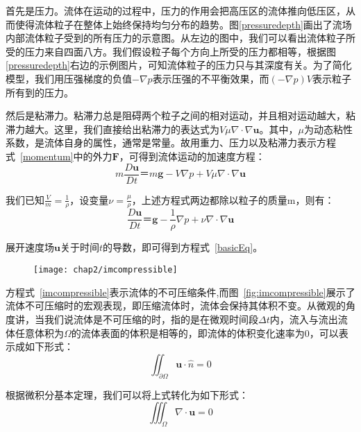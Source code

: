 首先是压力。流体在运动的过程中，压力的作用会把高压区的流体推向低压区，从而使得流体粒子在整体上始终保持均匀分布的趋势。图\ref{pressuredepth}画出了流场内部流体粒子受到的所有压力的示意图。从左边的图中，我们可以看出流体粒子所受的压力来自四面八方。我们假设粒子每个方向上所受的压力都相等，根据图\ref{pressuredepth}右边的示例图片，可知流体粒子的压力只与其深度有关。为了简化模型，我们用压强梯度的负值\(-\nabla p\)表示压强的不平衡效果，而\(({-\nabla p})V\)表示粒子所有到的压力。

然后是粘滞力。粘滞力总是阻碍两个粒子之间的相对运动，并且相对运动越大，粘滞力越大。这里，我们直接给出粘滞力的表达式为\(V\mu{\nabla \cdot \nabla {\boldsymbol u}}\)。其中，\(\mu\)为动态粘性系数，是流体自身的属性，通常是常量。故用重力、压力以及粘滞力表示方程式~\ref{momentum}中的外力\(\boldsymbol F\)，可得到流体运动的加速度方程：
\begin{equation}
 m\frac{D{\boldsymbol u}}{D{t}} ＝ m{\boldsymbol g} - V{\nabla p} + V{\mu}{\nabla \cdot \nabla {\boldsymbol u}}
\end{equation}

我们已知\(\frac{V}{m} = \frac{1}{\rho}\)，设变量\(\nu = \frac{\mu}{\rho}\)，上述方程式两边都除以粒子的质量m，则有：
\begin{equation}
 \frac{D{\boldsymbol u}}{D{t}} ＝ {\boldsymbol g} - \frac{1}{\rho}{\nabla p} + {\nu}{\nabla \cdot \nabla {\boldsymbol u}}
\end{equation}

展开速度场\(\boldsymbol u\)关于时间\(t\)的导数，即可得到方程式~\ref{basicEq}。

\begin{figure}[ht]
  \centering
   \texttt{[image: chap2/imcompressible]}
\end{figure}

方程式~\ref{imcompressible}表示流体的不可压缩条件,而图~\ref{fig:imcompressible}展示了流体不可压缩时的宏观表现，即压缩流体时，流体会保持其体积不变。从微观的角度讲，当我们说流体是不可压缩的时，指的是在微观时间段\(\Delta t\)内，流入与流出流体任意体积为\(\Omega\)的流体表面的体积是相等的，即流体的体积变化速率为0，可以表示成如下形式：
\begin{equation}
{\iint_{\partial \Omega}}{\boldsymbol u} \cdot {\hat n} = 0 
\end{equation}

根据微积分基本定理，我们可以将上式转化为如下形式：
\begin{equation}
{\iiint_{\Omega}} \nabla \cdot {\boldsymbol u} = 0 
\end{equation}

